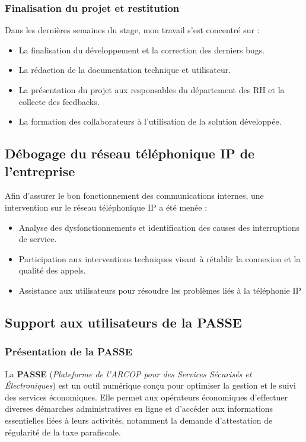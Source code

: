 \subsubsection{Finalisation du projet et restitution}
Dans les dernières semaines du stage, mon travail s'est concentré sur :

\begin{itemize}
    \item La finalisation du développement et la correction des derniers bugs.
    \item La rédaction de la documentation technique et utilisateur.
    \item La présentation du projet aux responsables du département des \ac{RH} et la collecte des feedbacks.
    \item La formation des collaborateurs à l'utilisation de la solution développée.

\end{itemize}
\subsection{Débogage du réseau téléphonique IP de l'entreprise}
Afin d’assurer le bon fonctionnement des communications internes, une intervention sur le réseau téléphonique IP a été menée :
\begin{itemize}
    \item Analyse des dysfonctionnements et identification des causes des interruptions de service.
    \item  Participation aux interventions techniques visant à rétablir la connexion et  la qualité des appels.
    \item Assistance aux utilisateurs pour résoudre les problèmes liés à la téléphonie IP
\end{itemize}


\subsection{Support aux utilisateurs de la \acs{PASSE}}

\subsubsection{Présentation de la PASSE}
La \textbf{\ac{PASSE}} (\textit{Plateforme de l’ARCOP pour des Services Sécurisés et Électroniques}) est un outil numérique conçu pour optimiser la gestion et le suivi des services économiques. Elle permet aux opérateurs économiques d’effectuer diverses démarches administratives en ligne et d’accéder aux informations essentielles liées à leurs activités, notamment la demande d’attestation de régularité de la taxe parafiscale.

